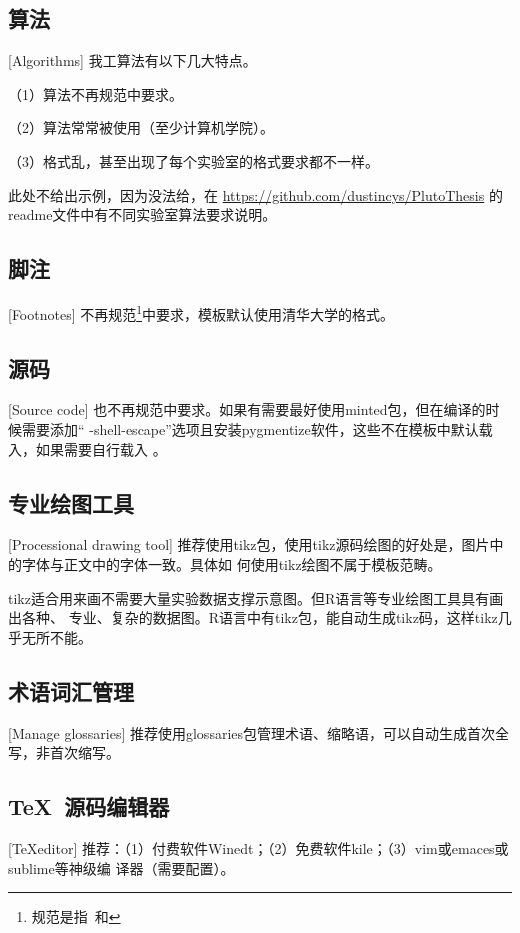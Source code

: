\subsection{算法}[Algorithms]
我工算法有以下几大特点。

（1）算法不再规范中要求。

（2）算法常常被使用（至少计算机学院）。

（3）格式乱，甚至出现了每个实验室的格式要求都不一样。

此处不给出示例，因为没法给，在
\href{https://github.com/dustincys/PlutoThesis}{https://github.com/dustincys/PlutoThesis}
的readme文件中有不同实验室算法要求说明。

\subsection{脚注}[Footnotes]
不再规范\footnote{规范是指\PGR\ 和\UGR}中要求，模板默认使用清华大学的格式。

\subsection{源码}[Source code]
也不再规范中要求。如果有需要最好使用minted包，但在编译的时候需要添加“
-shell-escape”选项且安装pygmentize软件，这些不在模板中默认载入，如果需要自行载入
。

\subsection{专业绘图工具}[Processional drawing tool]
推荐使用tikz包，使用tikz源码绘图的好处是，图片中的字体与正文中的字体一致。具体如
何使用tikz绘图不属于模板范畴。

tikz适合用来画不需要大量实验数据支撑示意图。但R语言等专业绘图工具具有画出各种、
专业、复杂的数据图。R语言中有tikz包，能自动生成tikz码，这样tikz几乎无所不能。

\subsection{术语词汇管理}[Manage glossaries]
推荐使用glossaries包管理术语、缩略语，可以自动生成首次全写，非首次缩写。

\subsection{\TeX\ 源码编辑器}[\TeX editor]
推荐：（1）付费软件Winedt；（2）免费软件kile；（3）vim或emaces或sublime等神级编
译器（需要配置）。


